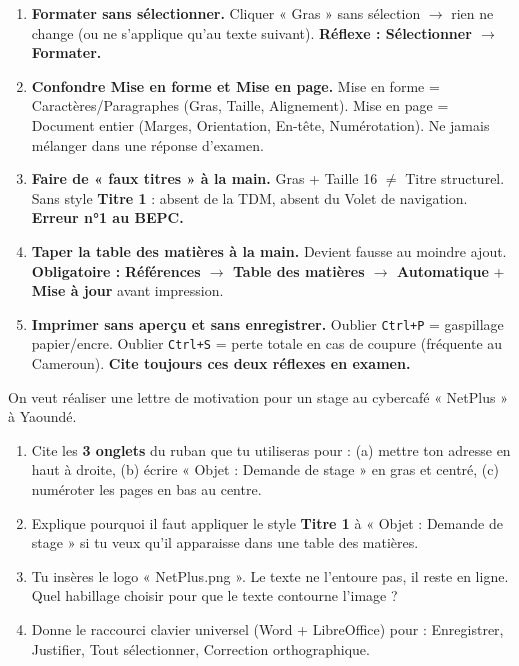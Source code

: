 \documentclass[11pt]{article}
\begin{document}
\begin{attention}
\begin{enumerate}
  \item \textbf{Formater sans sélectionner.} Cliquer « Gras » sans sélection $\rightarrow$ rien ne change (ou ne s'applique qu'au texte suivant). \textbf{Réflexe : Sélectionner $\rightarrow$ Formater.}
  \item \textbf{Confondre Mise en forme et Mise en page.} Mise en forme = Caractères/Paragraphes (Gras, Taille, Alignement). Mise en page = Document entier (Marges, Orientation, En-tête, Numérotation). Ne jamais mélanger dans une réponse d'examen.
  \item \textbf{Faire de « faux titres » à la main.} Gras + Taille 16 $\neq$ Titre structurel. Sans style \textbf{Titre 1} : absent de la TDM, absent du Volet de navigation. \textbf{Erreur n°1 au BEPC.}
  \item \textbf{Taper la table des matières à la main.} Devient fausse au moindre ajout. \textbf{Obligatoire :} \textbf{Références $\rightarrow$ Table des matières $\rightarrow$ Automatique} + \textbf{Mise à jour} avant impression.
  \item \textbf{Imprimer sans aperçu et sans enregistrer.} Oublier \texttt{Ctrl+P} = gaspillage papier/encre. Oublier \texttt{Ctrl+S} = perte totale en cas de coupure (fréquente au Cameroun). \textbf{Cite toujours ces deux réflexes en examen.}
\end{enumerate}
\end{attention}

\begin{exercice}
On veut réaliser une lettre de motivation pour un stage au cybercafé « NetPlus » à Yaoundé.
\begin{enumerate}
  \item Cite les \textbf{3 onglets} du ruban que tu utiliseras pour : (a) mettre ton adresse en haut à droite, (b) écrire « Objet : Demande de stage » en gras et centré, (c) numéroter les pages en bas au centre.
  \item Explique pourquoi il faut appliquer le style \textbf{Titre 1} à « Objet : Demande de stage » si tu veux qu'il apparaisse dans une table des matières.
  \item Tu insères le logo « NetPlus.png ». Le texte ne l'entoure pas, il reste en ligne. Quel habillage choisir pour que le texte contourne l'image ?
  \item Donne le raccourci clavier universel (Word + LibreOffice) pour : Enregistrer, Justifier, Tout sélectionner, Correction orthographique.
\end{enumerate}
\end{exercice}
\end{document}

